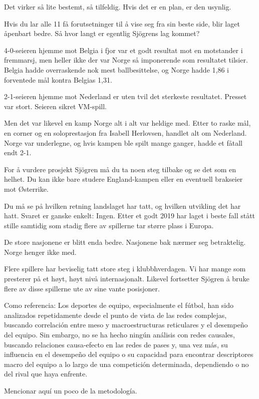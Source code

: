 Det virker så lite bestemt, så tilfeldig. Hvis det er en plan, er den usynlig.

Hvis du lar alle 11 få forutsetninger til å vise seg fra sin beste side, blir laget åpenbart bedre. Så hvor langt er egentlig Sjögrens lag kommet?

4-0-seieren hjemme mot Belgia i fjor var et godt resultat mot en motstander i fremmarsj, men heller ikke der var Norge så imponerende som resultatet tilsier. Belgia hadde overraskende nok mest ballbesittelse, og Norge hadde 1,86 i forventede mål kontra Belgias 1,31.

2-1-seieren hjemme mot Nederland er uten tvil det sterkeste resultatet. Presset var stort. Seieren sikret VM-spill.

Men det var likevel en kamp Norge alt i alt var heldige med. Etter to raske mål, en corner og en soloprestasjon fra Isabell Herlovsen, handlet alt om Nederland. Norge var underlegne, og hvis kampen ble spilt mange ganger, hadde et fåtall endt 2-1.

For å vurdere prosjekt Sjögren må du ta noen steg tilbake og se det som en helhet. Du kan ikke bare studere England-kampen eller en eventuell brakseier mot Østerrike.

Du må se på hvilken retning landslaget har tatt, og hvilken utvikling det har hatt. Svaret er ganske enkelt: Ingen. Etter et godt 2019 har laget i beste fall stått stille samtidig som stadig flere av spillerne tar større plass i Europa.

De store nasjonene er blitt enda bedre. Nasjonene bak nærmer seg betraktelig. Norge henger ikke med.

Flere spillere har beviselig tatt store steg i klubbhverdagen. Vi har mange som presterer på et høyt, høyt nivå internasjonalt. Likevel fortsetter Sjögren å bruke flere av disse spillerne ute av sine vante posisjoner.

Como referencia: 
Los deportes de equipo, especialmente el fútbol, han sido analizados 
repetidamente desde el punto de vista de las redes complejas, buscando 
correlación entre meso y macroestructuras reticulares y el desempeño del 
equipo. Sin embargo, no se ha hecho ningún análisis con redes causales, 
buscando relaciones causa-efecto en las redes de pases y, una vez más, 
su influencia en el desempeño del equipo o su capacidad para encontrar 
descriptores macro del equipo a lo largo de una competición determinada, 
dependiendo o no del rival que haya enfrente.

Mencionar aquí un poco de la metodología.

